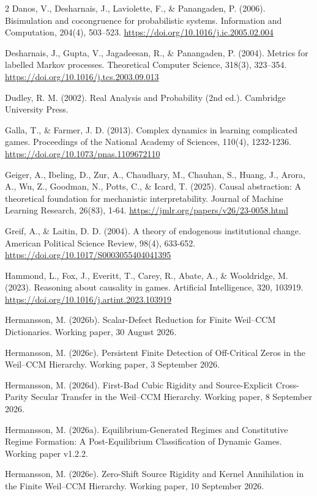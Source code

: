 \documentclass[10pt]{article}
\begin{document}
\begin{multicols}{2}
Danos, V., Desharnais, J., Laviolette, F., \& Panangaden, P. (2006). Bisimulation and cocongruence for probabilistic systems. Information and Computation, 204(4), 503--523. \url{https://doi.org/10.1016/j.ic.2005.02.004}

Desharnais, J., Gupta, V., Jagadeesan, R., \& Panangaden, P. (2004). Metrics for labelled Markov processes. Theoretical Computer Science, 318(3), 323--354. \url{https://doi.org/10.1016/j.tcs.2003.09.013}

Dudley, R. M. (2002). Real Analysis and Probability (2nd ed.). Cambridge University Press.

Galla, T., \& Farmer, J. D. (2013). Complex dynamics in learning
complicated games. Proceedings of the National Academy of Sciences,
110(4), 1232-1236. \url{https://doi.org/10.1073/pnas.1109672110}

Geiger, A., Ibeling, D., Zur, A., Chaudhary, M., Chauhan, S., Huang, J.,
Arora, A., Wu, Z., Goodman, N., Potts, C., \& Icard, T. (2025). Causal
abstraction: A theoretical foundation for mechanistic interpretability.
Journal of Machine Learning Research, 26(83), 1-64.
\url{https://jmlr.org/papers/v26/23-0058.html}

Greif, A., \& Laitin, D. D. (2004). A theory of endogenous institutional
change. American Political Science Review, 98(4), 633-652.
\url{https://doi.org/10.1017/S0003055404041395}

Hammond, L., Fox, J., Everitt, T., Carey, R., Abate, A., \& Wooldridge,
M. (2023). Reasoning about causality in games. Artificial Intelligence,
320, 103919. \url{https://doi.org/10.1016/j.artint.2023.103919}

Hermansson, M. (2026b). Scalar-Defect Reduction for Finite Weil--CCM Dictionaries. Working paper, 30 August 2026.

Hermansson, M. (2026c). Persistent Finite Detection of Off-Critical Zeros in the Weil--CCM Hierarchy. Working paper, 3 September 2026.

Hermansson, M. (2026d). First-Bad Cubic Rigidity and Source-Explicit Cross-Parity Secular Transfer in the Weil--CCM Hierarchy. Working paper, 8 September 2026.

Hermansson, M. (2026a). Equilibrium-Generated Regimes and Constitutive
Regime Formation: A Post-Equilibrium Classification of Dynamic Games.
Working paper v1.2.2.

Hermansson, M. (2026e). Zero-Shift Source Rigidity and Kernel Annihilation in the Finite Weil--CCM Hierarchy. Working paper, 10 September 2026.


\end{multicols}
\end{document}
